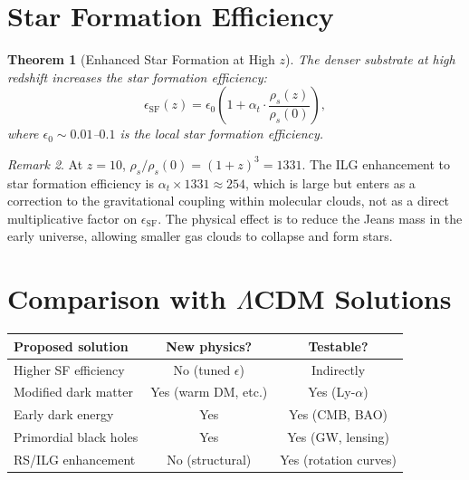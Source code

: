 \documentclass[12pt,a4paper]{article}
\newtheorem{theorem}{Theorem}[section]
\theoremstyle{definition}
\theoremstyle{remark}
\newtheorem{remark}[theorem]{Remark}
\begin{document}
\section{Star Formation Efficiency}
\label{sec:sfe}

\begin{theorem}[Enhanced Star Formation at High $z$]
The denser substrate at high redshift increases the star formation
efficiency:
\begin{equation}
  \epsilon_{\mathrm{SF}}(z) = \epsilon_0 \left(1 +
  \alpha_t \cdot \frac{\rho_s(z)}{\rho_s(0)}\right),
\end{equation}
where $\epsilon_0 \sim 0.01$--$0.1$ is the local star formation
efficiency.
\end{theorem}

\begin{remark}
At $z = 10$, $\rho_s/\rho_s(0) = (1+z)^3 = 1331$.  The ILG
enhancement to star formation efficiency is
$\alpha_t \times 1331 \approx 254$, which is large but enters as
a correction to the gravitational coupling within molecular clouds,
not as a direct multiplicative factor on $\epsilon_{\mathrm{SF}}$.
The physical effect is to reduce the Jeans mass in the early
universe, allowing smaller gas clouds to collapse and form stars.
\end{remark}

\section{Comparison with $\Lambda$CDM Solutions}
\label{sec:comparison}

\begin{center}
\renewcommand{\arraystretch}{1.3}
\begin{tabular}{@{}lcc@{}}
\toprule
\textbf{Proposed solution} & \textbf{New physics?} &
\textbf{Testable?} \\
\midrule
Higher SF efficiency & No (tuned $\epsilon$) & Indirectly \\
Modified dark matter & Yes (warm DM, etc.) & Yes (Ly-$\alpha$) \\
Early dark energy & Yes & Yes (CMB, BAO) \\
Primordial black holes & Yes & Yes (GW, lensing) \\
RS/ILG enhancement & No (structural) & Yes (rotation curves) \\
\bottomrule
\end{tabular}
\end{center}
\end{document}
